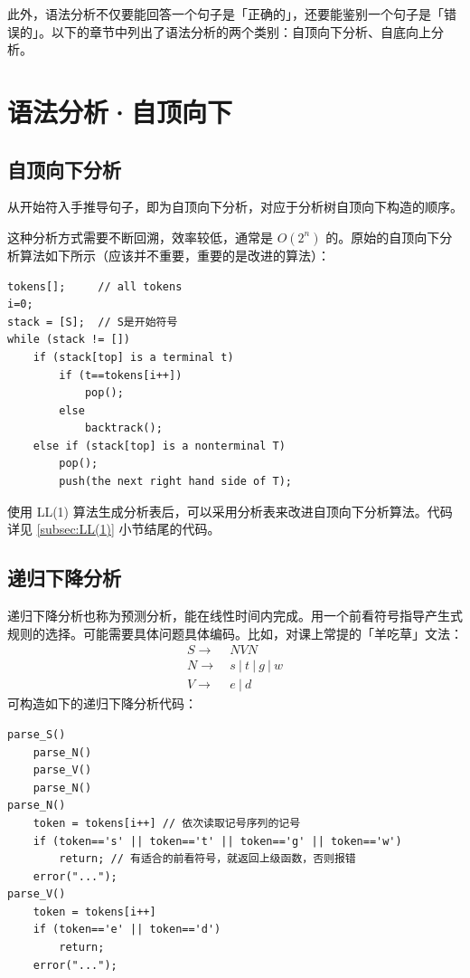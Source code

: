 \documentclass[UTF8]{ctexart}
\newcommand\OR{\ |\ }
\newcommand\Emph[1]{\textcolor{cyan!80!black}{#1}}
\begin{document}
此外，语法分析不仅要能回答一个句子是「正确的」，还要能鉴别一个句子是「错误的」。以下的章节中列出了语法分析的两个类别：自顶向下分析、自底向上分析。

\section{语法分析·自顶向下}
\subsection{自顶向下分析}\label{subsec:自顶向下分析}
从开始符入手推导句子，即为\Emph{自顶向下分析}，对应于分析树自顶向下构造的顺序。

这种分析方式需要不断回溯，效率较低，通常是 $O(2^n)$ 的。原始的自顶向下分析算法如下所示（应该并不重要，重要的是改进的算法）：
\begin{lstlisting}
tokens[];     // all tokens
i=0;
stack = [S];  // S是开始符号
while (stack != [])
    if (stack[top] is a terminal t)
        if (t==tokens[i++])
            pop();
        else
            backtrack();
    else if (stack[top] is a nonterminal T)
        pop();
        push(the next right hand side of T);
\end{lstlisting}


使用 LL(1) 算法生成\Emph{分析表}后，可以采用分析表来改进自顶向下分析算法。代码详见 \ref{subsec:LL(1)} 小节结尾的代码。


\subsection{递归下降分析}
\Emph{递归下降分析}也称为预测分析，能在线性时间内完成。用一个前看符号指导产生式规则的选择。可能需要具体问题具体编码。比如，对课上常提的「羊吃草」文法：
\begin{equation}\label{eq:G-NVN}
\begin{split}
   S\to\  & NVN \\
   N\to\  & s \OR t \OR g \OR w \\
   V\to\  & e \OR d
\end{split}
\end{equation}
可构造如下的递归下降分析代码：

\begin{lstlisting}
parse_S()
    parse_N()
    parse_V()
    parse_N()
parse_N()
    token = tokens[i++] // 依次读取记号序列的记号
    if (token=='s' || token=='t' || token=='g' || token=='w')
        return; // 有适合的前看符号，就返回上级函数，否则报错
    error("...");
parse_V()
    token = tokens[i++]
    if (token=='e' || token=='d')
        return;
    error("...");
\end{lstlisting}
\end{document}
